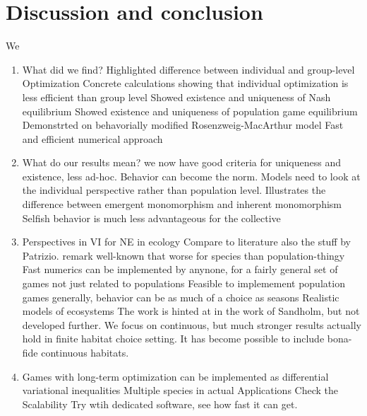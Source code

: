 \section{Discussion and conclusion}
We


\begin{enumerate}
  \item What did we find?
    Highlighted difference between individual and group-level Optimization
    Concrete calculations showing that individual optimization is less efficient than group level
    Showed existence and uniqueness of Nash equilibrium
    Showed existence and uniqueness of population game equilibrium
    Demonstrted on behavorially modified Rosenzweig-MacArthur model
    Fast and efficient numerical approach
  \item What do our results mean?
    we now have good criteria for uniqueness and existence, less ad-hoc.
    Behavior can become the norm.
    Models need to look at the individual perspective rather than population level.
    Illustrates the difference between emergent monomorphism and inherent monomorphism
    Selfish behavior is much less advantageous for the collective

  \item Perspectives in VI for NE in ecology  Compare to literature also the stuff by Patrizio. remark well-known that worse for species than population-thingy
    Fast numerics can be implemented by anynone, for a fairly general set of games not just related to populations
    Feasible to implemement population games generally, behavior can be as much of a choice as seasons
    Realistic models of ecosystems
    The work is hinted at in the work of Sandholm, but not developed further.
    We focus on continuous, but much stronger results actually hold in finite habitat choice setting.
    It has become possible to include bona-fide continuous habitats.
  \item
    Games with long-term optimization can be implemented as differential variational inequalities
    Multiple species in actual Applications
    Check the Scalability
    Try wtih dedicated software, see how fast it can get.

\end{enumerate}
